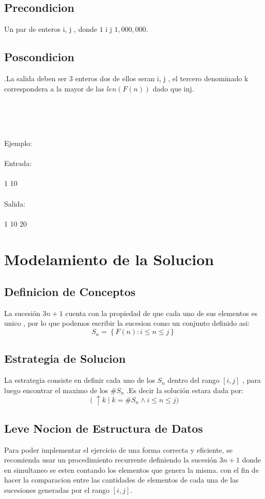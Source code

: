 \documentclass[12pt]{article}
\begin{document}
\subsection{Precondicion}
 Un par de enteros i, j , donde $1$ \leq i \leq j \leq $1,000,000$.
\subsection{Poscondicion}
.La salida deben ser 3 enteros dos de ellos seran i, j , el tercero denominado k correspondera a la mayor de las $len(F(n))$ dado que i\leq n\leq j.
\item
\\ \\ \\
\item Ejemplo:\\\\ Entrada:\\\\1 10\\\\Salida:\\\\1 10 20 \\
\section{Modelamiento de la Solucion}
\subsection{Definicion de Conceptos}
\item La sucesi\'on $3n+1$ cuenta con la propiedad de que cada uno de sus elementos es unico , por lo que podemos escribir la sucesion como un conjunto definido asi:\\ \[
S_n=\left\{F(n): i\leq n \leq j \right\}
\]
\subsection{Estrategia de Solucion}
\item La estrategia consiste en definir cada uno de los $S_n$ dentro del rango $[i,j]$ , para luego encontrar el maximo de los $\#S_n$ .Es decir la soluci\'on estara dada por:\\ \[\left(\uparrow k\mid k=\# S_n \wedge i\leq n \leq j)
\]
\subsection{Leve Nocion de Estructura de Datos}
Para poder implementar el ejercicio de una forma correcta y eficiente, se recomienda usar un procedimiento recurrente definiendo la sucesi\'on $3n+1$ donde en simultaneo se esten contando los elementos que genera la misma. con el fin de hacer la comparacion entre las cantidades de elementos de cada una de las sucesiones generadas por el rango $[i,j]$.
\end{document}
